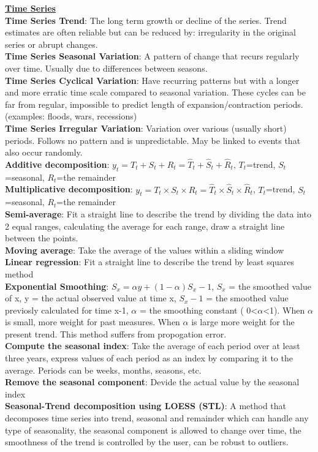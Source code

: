 \documentclass[a4paper,7pt,landscape]{extarticle}
\begin{document}
\begin{multicols}{3}
\begin{boxA}
\underline{\textbf{Time Series}}\\
\textbf{Time Series Trend}: The long term growth or decline of the series. Trend estimates are often reliable but can be reduced by: irregularity in the original series or abrupt changes.\\
\textbf{Time Series Seasonal Variation}: A pattern of change that recurs regularly over time. Usually due to differences between seasons.\\
\textbf{Time Series Cyclical Variation}: Have recurring patterns but with a longer and more erratic time scale compared to seasonal variation. These cycles can be far from regular, impossible to predict length of expansion/contraction periods. (examples: floods, wars, recessions)\\
\textbf{Time Series Irregular Variation}: Variation over various (usually short) periods. Follows no pattern and is unpredictable. May be linked to events that also occur randomly.\\
\textbf{Additive decomposition}: $y_t = T_t + S_t + R_t = \hat{T}_t + \hat{S}_t + \hat{R}_t$, $T_t$=trend, $S_t$=seasonal, $R_t$=the remainder\\
\textbf{Multiplicative decomposition}: $y_t = T_t \times S_t \times R_t = \hat{T}_t \times \hat{S}_t \times \hat{R}_t$, $T_t$=trend, $S_t$=seasonal, $R_t$=the remainder\\
\textbf{Semi-average}: Fit a straight line to describe the trend by dividing the data into 2 equal ranges, calculating the average for each range, draw a straight line between the points.\\
\textbf{Moving average}: Take the average of the values within a sliding window\\
\textbf{Linear regression}: Fit a straight line to describe the trend by least squares method\\
\textbf{Exponential Smoothing}: $S_x = \alpha y + (1-\alpha)S_x-1$, $S_x$ = the smoothed value of x, y = the actual observed value at time x, $S_x-1$ = the smoothed value previosly calculated for time x-1, $\alpha$ = the smoothing constant ( 0<$\alpha$<1). When $\alpha$ is small, more weight for past measures. When $\alpha$ is large more weight for the present trend. This method suffers from propogation error.\\
\textbf{Compute the seasonal index}: Take the average of each period over at least three years, express values of each period as an index by comparing it to the average. Periods can be weeks, months, seasons, etc.\\
\textbf{Remove the seasonal component}: Devide the actual value by the seasonal index\\
\textbf{Seasonal-Trend decomposition using LOESS (STL)}: A method that decomposes time series into trend, seasonal and remainder which can handle any type of seasonality, the seasonal component is allowed to change over time, the smoothness of the trend is controlled by the user, can be robust to outliers.\\
\end{boxA}


\end{multicols}
\end{document}
